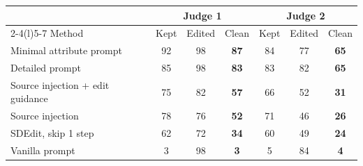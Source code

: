\begin{tabular}{@{}lcccccc@{}}
\toprule
 & \multicolumn{3}{c}{Judge 1} & \multicolumn{3}{c}{Judge 2} \\
\cmidrule(lr){2-4}\cmidrule(l){5-7}
Method & Kept & Edited & Clean & Kept & Edited & Clean \\
\midrule
Minimal attribute prompt & 92 & 98 & \textbf{87} & 84 & 77 & \textbf{65} \\
Detailed prompt & 85 & 98 & \textbf{83} & 83 & 82 & \textbf{65} \\
Source injection + edit guidance & 75 & 82 & \textbf{57} & 66 & 52 & \textbf{31} \\
Source injection & 78 & 76 & \textbf{52} & 71 & 46 & \textbf{26} \\
SDEdit, skip 1 step & 62 & 72 & \textbf{34} & 60 & 49 & \textbf{24} \\
Vanilla prompt & 3 & 98 & \textbf{3} & 5 & 84 & \textbf{4} \\
\bottomrule
\end{tabular}